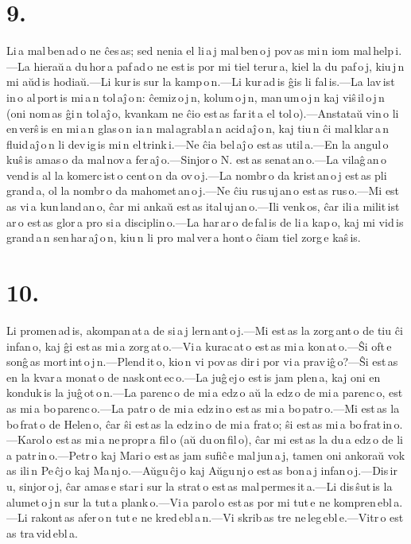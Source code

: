 \documentclass[ngerman,12pt,twoside]{book}
\begin{document}
\section*{9.}

Li\,a mal\,ben\,ad\,o ne ĉes\,as; sed nenia el li\,a\,j mal\,ben\,o\,j pov\,as mi\,n iom mal\,help\,i.---La hieraŭ\,a du\,hor\,a paf\,ad\,o ne est\,is por mi tiel terur\,a, kiel la du paf\,o\,j, kiu\,j\,n mi aŭd\,is hodiaŭ.---Li kur\,is sur la kamp\,o\,n.---Li kur\,ad\,is ĝis li fal\,is.---La lav\,ist\,in\,o al\,port\,is mi\,a\,n tol\,aĵ\,o\,n: ĉemiz\,o\,j\,n, kolum\,o\,j\,n, man\,um\,o\,j\,n kaj viŝ\,il\,o\,j\,n (oni nom\,as ĝi\,n tol\,aĵ\,o, kvankam ne ĉio est\,as far\,it\,a el tol\,o).---Anstataŭ vin\,o li en\,verŝ\,is en mi\,a\,n glas\,o\,n ia\,n mal\,agrabl\,a\,n acid\,aĵ\,o\,n, kaj tiu\,n ĉi mal\,klar\,a\,n fluid\,aĵ\,o\,n li dev\,ig\,is mi\,n el\,trink\,i.---Ne ĉia bel\,aĵ\,o est\,as util\,a.---En la angul\,o kuŝ\,is amas\,o da mal\,nov\,a fer\,aĵ\,o.---Sinjor\,o N. est\,as senat\,an\,o.---La vilaĝ\,an\,o vend\,is al la komerc\,ist\,o cent\,o\,n da ov\,o\,j.---La nombr\,o da krist\,an\,o\,j est\,as pli grand\,a, ol la nombr\,o da mahomet\,an\,o\,j.---Ne ĉiu rus\,uj\,an\,o est\,as rus\,o.---Mi est\,as vi\,a kun\,land\,an\,o, ĉar mi ankaŭ est\,as ital\,uj\,an\,o.---Ili venk\,os, ĉar ili\,a milit\,ist\,ar\,o est\,as glor\,a pro si\,a disciplin\,o.---La har\,ar\,o de\,fal\,is de li\,a kap\,o, kaj mi vid\,is grand\,a\,n sen\,har\,aĵ\,o\,n, kiu\,n li pro mal\,ver\,a hont\,o ĉiam tiel zorg\,e kaŝ\,is. 

\section*{10.}

Li promen\,ad\,is, akompan\,at\,a de si\,a\,j lern\,ant\,o\,j.---Mi est\,as la zorg\,ant\,o de tiu ĉi infan\,o, kaj ĝi est\,as mi\,a zorg\,at\,o.---Vi\,a kurac\,at\,o est\,as mi\,a kon\,at\,o.---Ŝi oft\,e sonĝ\,as mort\,int\,o\,j\,n.---Plend\,it\,o, kio\,n vi pov\,as dir\,i por vi\,a prav\,iĝ\,o?---Ŝi est\,as en la kvar\,a monat\,o de nask\,ont\,ec\,o.---La juĝ\,ej\,o est\,is jam plen\,a, kaj oni en\,konduk\,is la juĝ\,ot\,o\,n.---La parenc\,o de mi\,a edz\,o aŭ la edz\,o de mi\,a parenc\,o, est\,as mi\,a bo\,parenc\,o.---La patr\,o de mi\,a edz\,in\,o est\,as mi\,a bo\,patr\,o.---Mi est\,as la bo\,frat\,o de Helen\,o, ĉar ŝi est\,as la edz\,in\,o de mi\,a frat\,o; ŝi est\,as mi\,a bo\,frat\,in\,o.---Karol\,o est\,as mi\,a ne\,propr\,a fil\,o (aŭ du\,on\,fil\,o), ĉar mi est\,as la du\,a edz\,o de li\,a patr\,in\,o.---Petr\,o kaj Mari\,o est\,as jam sufiĉ\,e mal\,jun\,a\,j, tamen oni ankoraŭ vok\,as ili\,n Pe\,ĉj\,o kaj Ma\,nj\,o.---Aŭgu\,ĉj\,o kaj Aŭgu\,nj\,o est\,as bon\,a\,j infan\,o\,j.---Dis\,ir\,u, sinjor\,o\,j, ĉar amas\,e star\,i sur la strat\,o est\,as mal\,permes\,it\,a.---Li dis\,ŝut\,is la alumet\,o\,j\,n sur la tut\,a plank\,o.---Vi\,a parol\,o est\,as por mi tut\,e ne kompren\,ebl\,a.---Li rakont\,as afer\,o\,n tut\,e ne kred\,ebl\,a\,n.---Vi skrib\,as tre ne\,leg\,ebl\,e.---Vitr\,o est\,as tra\,vid\,ebl\,a. 
\end{document}
